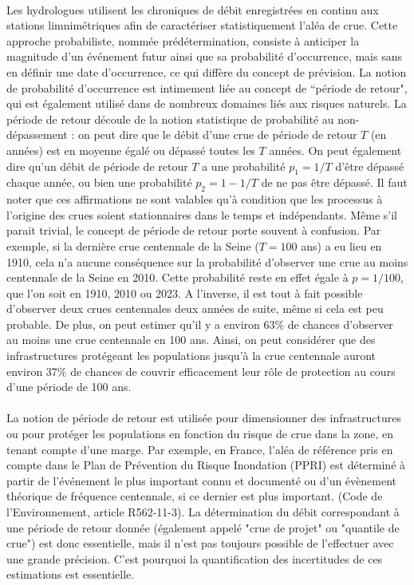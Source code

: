 	\paragraph{} Les hydrologues utilisent les chroniques de débit enregistrées en continu aux stations limnimétriques afin de caractériser statistiquement l'aléa de crue. Cette approche probabiliste, nommée prédétermination, consiste à anticiper la magnitude d'un événement futur ainsi que sa probabilité d'occurrence, mais sans en définir une date d'occurrence, ce qui diffère du concept de prévision. La notion de probabilité d'occurrence est intimement liée au concept de ``période de retour", qui est également utilisé dans de nombreux domaines liés aux risques naturels. La période de retour découle de la notion statistique de probabilité au non-dépassement : on peut dire que le débit d'une crue de période de retour $T$ (en années) est en moyenne égalé ou dépassé toutes les $T$ années. On peut également dire qu'un débit de période de retour $T$ a une probabilité $p_1 = 1/T$ d'être dépassé chaque année, ou bien une probabilité $p_2 = 1-1/T$ de ne pas être dépassé. Il faut noter que ces affirmations ne sont valables qu'à condition que les processus à l'origine des crues soient stationnaires dans le temps et indépendants. Même s'il parait trivial, le concept de période de retour porte souvent à confusion. Par exemple, si la dernière crue centennale de la Seine ($T = 100$ ans) a eu lieu en 1910, cela n'a aucune conséquence sur la probabilité d'observer une crue au moins centennale de la Seine en 2010. Cette probabilité reste en effet égale à $p = 1/100$, que l'on soit en 1910, 2010 ou 2023. A l'inverse, il est tout à fait possible d'observer deux crues centennales deux années de suite, même si cela est peu probable. De plus, on peut estimer qu'il y a environ 63\% de chances d'observer au moins une crue centennale en 100 ans. Ainsi, on peut considérer que des infrastructures protégeant les populations jusqu'à la crue centennale auront environ 37\% de chances de couvrir efficacement leur rôle de protection au cours d'une période de 100 ans. 	
	
	\paragraph{} La notion de période de retour est utilisée pour dimensionner des infrastructures ou pour protéger les populations en fonction du risque de crue dans la zone, en tenant compte d'une marge. Par exemple, en France, l'aléa de référence pris en compte dans le Plan de Prévention du Risque Inondation (PPRI) \og est déterminé à partir de l'événement le plus important connu et documenté ou d'un évènement théorique de fréquence centennale, si ce dernier est plus important.\fg{} (Code de l'Environnement, article R562-11-3). La détermination du débit correspondant à une période de retour donnée (également appelé "crue de projet" ou "quantile de crue") est donc essentielle, mais il n'est pas toujours possible de l'effectuer avec une grande précision. C'est pourquoi la quantification des incertitudes de ces estimations est essentielle.
	
